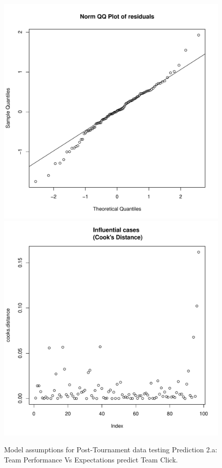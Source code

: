 \begin{CJK}{UTF8}{gbsn}
\begin{figure}[htbp]
         \includegraphics[scale =.4]{images/MLM1bQQNorm.pdf}
         \includegraphics[scale =.4]{images/MLM1bCooksD.pdf}
         \caption{Model assumptions for Post-Tournament data testing Prediction 2.a: Team Performance Vs Expectations predict Team Click.}
         \label{fig:MLM1bAssumptions}
       \end{figure}




\end{CJK}
